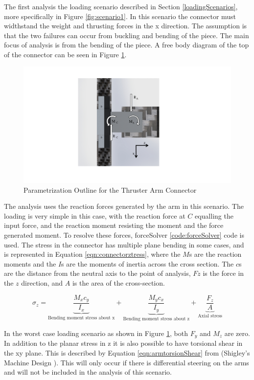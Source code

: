 \documentclass[../main.tex]{subfiles}
\begin{document}
The first analysis the loading scenario described in Section \ref{loadingScenarios}, more specifically in Figure \ref{fig:scenario1}. In this scenario the connector must widthstand the weight and thrusting forces in the x direction. The assumption is that the two failures can occur from buckling and bending of the piece. The main focus of analysis is from the bending of the piece. A free body diagram of the top of the connector can be seen in Figure \ref{fig:armConnector}. 

\begin{figure}[H]
	\centering
	\includegraphics[page={1}, width=.7\linewidth]{img/analysis/arm/armConnector.pdf}
	\caption{Parametrization Outline for the Thruster Arm Connector}
	\label{fig:armConnector}
\end{figure}

The analysis uses the reaction forces generated by the arm in this scenario. The loading is very simple in this case, with the reaction force at $C$ equalling the input force, and the reaction moment resisting the moment and the force generated moment. To resolve these forces, forceSolver \ref{code:forceSolver} code is used. The stress in the connector has multiple plane bending in some cases, and is represented in Equation \ref{eqn:connectorztress}, where the $M$s are the reaction moments and the $I$s are the moments of inertia across the cross section. The $c$s are the distance from the neutral axis to the point of analysis, $Fz$ is the force in the $z$ direction, and $A$ is the area of the cross-section.

\begin{equation}
\label{eqn:connectorztress}
\sigma_{z}=  \underbrace{\frac{M_{x}c_y}{I_x}}_\text{Bending moment stress about x} + \underbrace{\frac{M_{y}c_x}{I_y}}_\text{Bending moment stress about z} + \underbrace{\frac{F_z}{A}}_\text{Axial stress} 
\end{equation}

In the worst case loading scenario as shown in Figure \ref{fig:armConnector}, both $F_y$ and $M_z$ are zero. In addition to the planar stress in z it is also possible to have torsional shear in the xy plane. This is described by Equation \ref{eqn:armtorsionShear} from {(Shigley's Machine Design \cite[102]{shigley})}. This will only occur if there is differential steering on the arms and will not be included in the analysis of this scenario.
\end{document}
